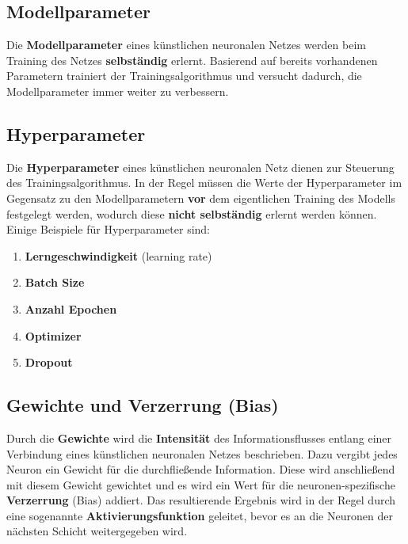 \subsection{Modellparameter}

Die \textbf{Modellparameter} eines künstlichen neuronalen Netzes werden beim Training des Netzes \textbf{selbständig} erlernt. Basierend auf bereits vorhandenen Parametern trainiert der Trainingsalgorithmus und versucht dadurch, die Modellparameter immer weiter zu verbessern. \cite{divis}

\subsection{Hyperparameter}

Die \textbf{Hyperparameter} eines künstlichen neuronalen Netz dienen zur Steuerung des Trainingsalgorithmus. In der Regel müssen die Werte der Hyperparameter im Gegensatz zu den Modellparametern \textbf{vor} dem eigentlichen Training des Modells festgelegt werden, wodurch diese \textbf{nicht selbständig} erlernt werden können. \cite{wiki} \\

Einige Beispiele für Hyperparameter sind:

\begin{enumerate}
	\item \textbf{Lerngeschwindigkeit} (learning rate)
	\item \textbf{Batch Size}
	\item \textbf{Anzahl Epochen}
	\item \textbf{Optimizer}
	\item \textbf{Dropout}
\end{enumerate}
	
\subsection{Gewichte und Verzerrung (Bias)}

	Durch die \textbf{Gewichte} wird die \textbf{Intensität} des Informationsflusses entlang einer Verbindung eines künstlichen neuronalen Netzes beschrieben. Dazu vergibt jedes Neuron ein Gewicht für die durchfließende Information. Diese wird anschließend mit diesem Gewicht gewichtet und es wird ein Wert für die neuronen-spezifische \textbf{Verzerrung} (Bias) addiert. Das resultierende Ergebnis wird in der Regel durch eine sogenannte \textbf{Aktivierungsfunktion} geleitet, bevor es an die Neuronen der nächsten Schicht weitergegeben wird. \cite{jaai} \\
	
